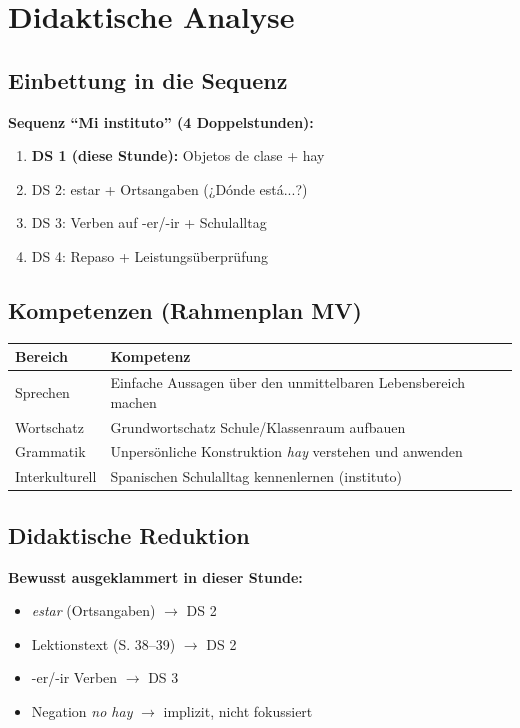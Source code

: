 \documentclass[11pt,a4paper]{article}
\begin{document}
\section{Didaktische Analyse}

\subsection{Einbettung in die Sequenz}

\textbf{Sequenz ``Mi instituto'' (4 Doppelstunden):}

\begin{enumerate}
    \item \textbf{DS 1 (diese Stunde):} Objetos de clase + hay
    \item DS 2: estar + Ortsangaben (¿Dónde está...?)
    \item DS 3: Verben auf -er/-ir + Schulalltag
    \item DS 4: Repaso + Leistungsüberprüfung
\end{enumerate}

\subsection{Kompetenzen (Rahmenplan MV)}

\begin{tabular}{|l|p{10cm}|}
\hline
\textbf{Bereich} & \textbf{Kompetenz} \\
\hline
Sprechen & Einfache Aussagen über den unmittelbaren Lebensbereich machen \\
\hline
Wortschatz & Grundwortschatz Schule/Klassenraum aufbauen \\
\hline
Grammatik & Unpersönliche Konstruktion \textit{hay} verstehen und anwenden \\
\hline
Interkulturell & Spanischen Schulalltag kennenlernen (instituto) \\
\hline
\end{tabular}

\subsection{Didaktische Reduktion}

\textbf{Bewusst ausgeklammert in dieser Stunde:}
\begin{itemize}
    \item \textit{estar} (Ortsangaben) $\rightarrow$ DS 2
    \item Lektionstext (S. 38--39) $\rightarrow$ DS 2
    \item -er/-ir Verben $\rightarrow$ DS 3
    \item Negation \textit{no hay} $\rightarrow$ implizit, nicht fokussiert
\end{itemize}
\end{document}
